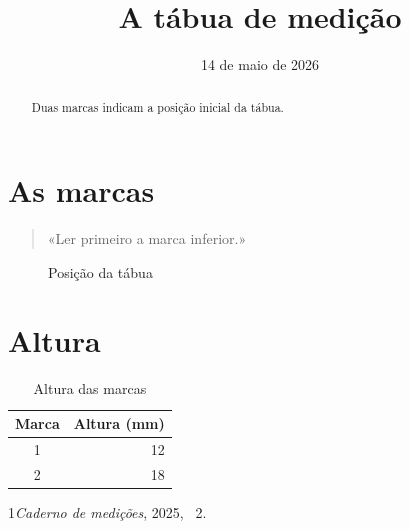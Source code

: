 \documentclass{article}
\begin{document}
\title{A tábua de medição}\author{}\date{14 de maio de 2026}\maketitle
\begin{abstract}Duas marcas indicam a posição inicial da tábua.\end{abstract}
\tableofcontents
\section{As marcas}\begin{quote}«Ler primeiro a marca inferior.»\end{quote}
\begin{figure}[ht]\centering\fbox{\rule{0pt}{8mm}\rule{33mm}{0pt}}\caption{Posição da tábua}\end{figure}
\section{Altura}
\begin{table}[ht]\centering\begin{tabular}{cr}Marca&Altura (mm)\\\hline 1&12\\2&18\end{tabular}\caption{Altura das marcas}\end{table}
\begin{thebibliography}{1}\emph{Caderno de medições}, 2025, \chaptername~2.\end{thebibliography}
\end{document}
